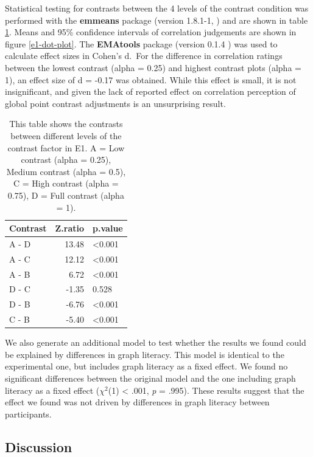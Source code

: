 \documentclass[preprint, 3p,
authoryear]{elsarticle} %
\begin{document}
Statistical testing for contrasts between the 4 levels of the contrast
condition was performed with the \textbf{emmeans} package (version
1.8.1-1, \citep{emmeans}) and are shown in table
\ref{contrasts-table-e1}. Means and 95\% confidence intervals of
correlation judgements are shown in figure \ref{e1-dot-plot}. The
\textbf{EMAtools} package (version 0.1.4 \citep{ematools}) was used to
calculate effect sizes in Cohen's d.~For the difference in correlation
ratings between the lowest contrast (alpha = 0.25) and highest contrast
plots (alpha = 1), an effect size of d = -0.17 was obtained. While this
effect is small, it is not insignificant, and given the lack of reported
effect on correlation perception of global point contrast adjustments
\citep{rensink_2012} is an unsurprising result.

\begin{table}

\caption{\label{tab:contrasts-table-e1}\label{contrasts-table-e1}This table shows the contrasts between different levels of the contrast factor in E1. A = Low contrast (alpha = 0.25), Medium contrast (alpha = 0.5), C = High contrast (alpha = 0.75), D = Full contrast (alpha = 1).}
\centering
\begin{tabular}[t]{lrl}
\toprule
Contrast & Z.ratio & p.value\\
\midrule
A - D & 13.48 & <0.001\\
A - C & 12.12 & <0.001\\
A - B & 6.72 & <0.001\\
D - C & -1.35 & 0.528\\
D - B & -6.76 & <0.001\\
\addlinespace
C - B & -5.40 & <0.001\\
\bottomrule
\end{tabular}
\end{table}

We also generate an additional model to test whether the results we
found could be explained by differences in graph literacy. This model is
identical to the experimental one, but includes graph literacy as a
fixed effect. We found no significant differences between the original
model and the one including graph literacy as a fixed effect
(\(\chi^2\)(1) \textless{} .001, \emph{p} = .995). These results suggest
that the effect we found was not driven by differences in graph literacy
between participants.

\hypertarget{discussion}{%
\subsection{Discussion}\label{discussion}}
\end{document}
